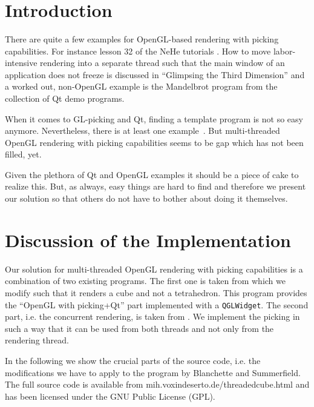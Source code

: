 \documentclass[jou,noapacite]{apa}
\title{
\mytitle
}
\begin{document}
\maketitle
%
%
\section{Introduction}
\label{sec:Introduction}

There are quite a few examples for OpenGL-based rendering with picking
capabilities.
%
For instance lesson 32 of the NeHe tutorials \cite{nehe32}.
%
How to move labor-intensive rendering into a separate thread such that the main
window of an application does not freeze is discussed in ``Glimpsing the Third
Dimension'' \cite{glimpse3d} and a worked out, non-OpenGL example is the
Mandelbrot program from the collection of Qt demo programs.

When it comes to GL-picking and Qt, finding a template program is not so easy
anymore.
%
Nevertheless, there is at least one example~\cite{Blanchette2008}.
%
But multi-threaded OpenGL rendering with picking capabilities seems to be gap
which has not been filled, yet.

Given the plethora of Qt and OpenGL examples it should be a piece of cake to
realize this.
%
But, as always, easy things are hard to find and therefore we present our
solution so that others do not have to bother about doing it themselves.




\section{Discussion of the Implementation}

Our solution for multi-threaded OpenGL rendering with picking capabilities is a
combination of two existing programs.
%
The first one is taken from \cite[chapter 8]{Blanchette2008} which we modify
such that it renders a cube and not a tetrahedron. This program provides the
``OpenGL with picking+Qt'' part implemented with a \lstinline|QGLWidget|.
%
The second part, i.e. the concurrent rendering, is taken from \cite{glimpse3d}.
%
We implement the picking in such a way that it can be used from both threads
and not only from the rendering thread.


In the following we show the crucial parts of the source code, i.e. the
modifications we have to apply to the program by Blanchette and Summerfield.
%
The full source  code is available from {\sf
mih.voxindeserto.de/threadedcube.html} and has been licensed under the GNU
Public License (GPL).
\end{document}
